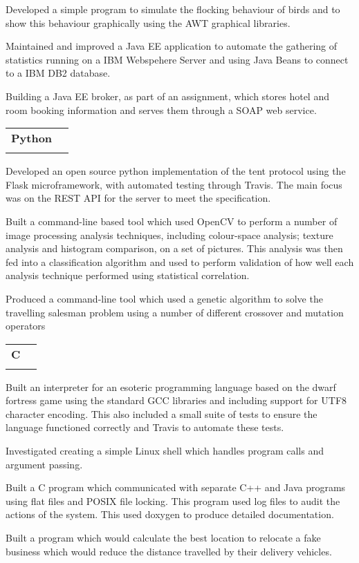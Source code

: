 \documentclass[letterpaper,11pt]{article}
\makeatletter
\newcommand{\ressubheading}[4]{
\vspace{10pt}
\begin{tabular*}{6.5in}{l@{\cftdotfill{\cftsecdotsep}\extracolsep{\fill}}r}
		\textbf{#1} & #2 \\
		\textit{#3} & \textit{#4} \\
\end{tabular*}\vspace{-6pt}
\vspace{10pt}}
\makeatother
\begin{document}
Developed a simple program to simulate the flocking behaviour of birds and to
show this behaviour graphically using the AWT graphical libraries. 

Maintained and improved a Java EE application to automate the gathering of 
statistics running on a IBM Webspehere Server and using Java Beans to connect to
a IBM DB2 database.

Building a Java EE broker, as part of an assignment, which stores hotel and 
room booking information and serves them through a SOAP web service.

\ressubheading{Python}{}{}{}

Developed an open source python implementation of the tent
protocol using the Flask microframework, with automated testing through Travis.
The main focus was on the REST API for the server to meet the specification.

Built a command-line based tool which used OpenCV to perform a number of 
image processing analysis techniques, including colour-space analysis; texture
analysis and histogram comparison, on a set of pictures. This analysis was 
then fed into a classification algorithm and used to perform validation of how
well each analysis technique performed using statistical correlation.

Produced a command-line tool which used a genetic algorithm to solve the 
travelling salesman problem using a number of different crossover and mutation
operators


\ressubheading{C}{}{}{}

Built an interpreter for an esoteric programming language based on the dwarf
fortress game using the standard GCC libraries and including support for UTF8
character encoding. This also included a small suite of tests to ensure the
language functioned correctly and Travis to automate these tests.

Investigated creating a simple Linux shell which handles program calls and
argument passing.

Built a C program which communicated with separate C++ and Java programs using
flat files and POSIX file locking. This program used log files to audit the
actions of the system. This used doxygen to produce detailed documentation.

Built a program which would calculate the best location to relocate a fake
business which would reduce the distance travelled by their delivery vehicles.
\end{document}
